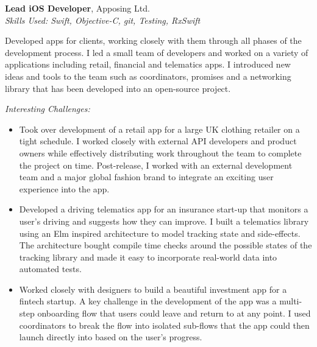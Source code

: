 \textbf{Lead iOS Developer}, Apposing Ltd. \\
\textit{Skills Used: Swift, Objective-C, git, Testing, RxSwift}

Developed apps for clients, working closely with them through all phases of the
development process. I led a small team of developers and worked on a variety of
applications including retail, financial and telematics apps. I introduced new
ideas and tools to the team such as coordinators, promises and a networking
library that has been developed into an open-source project.

\medskip

\textit{Interesting Challenges:}

\smallskip

\begin{itemize}
\item Took over development of a retail app for a large UK clothing retailer on
  a tight schedule. I worked closely with external API developers and product
  owners while effectively distributing work throughout the team to complete the
  project on time. Post-release, I worked with an external development team and
  a major global fashion brand to integrate an exciting user experience into the
  app.

\item Developed a driving telematics app for an insurance start-up that monitors
  a user's driving and suggests how they can improve. I built a telematics
  library using an Elm inspired architecture to model tracking state and
  side-effects. The architecture bought compile time checks around the possible
  states of the tracking library and made it easy to incorporate real-world data
  into automated tests.

\item Worked closely with designers to build a beautiful investment app for a
  fintech startup. A key challenge in the development of the app was a
  multi-step onboarding flow that users could leave and return to at any
  point. I used coordinators to break the flow into isolated sub-flows that the
  app could then launch directly into based on the user's progress.

\end{itemize}

